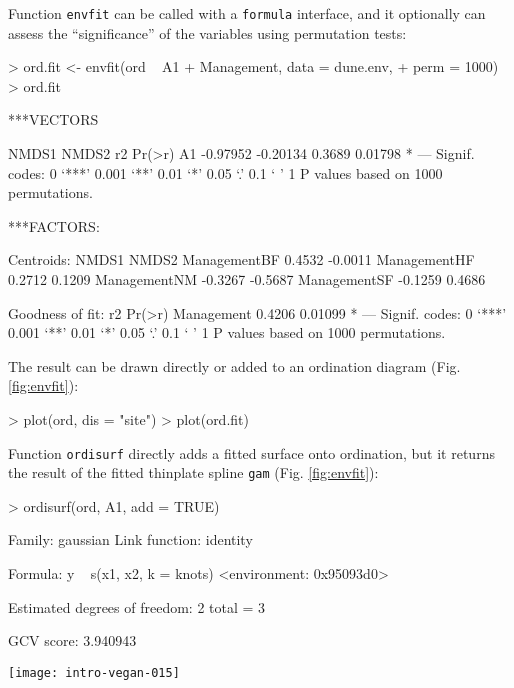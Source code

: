 \documentclass[a4paper,10pt]{amsart}
\begin{document}
Function \texttt{envfit} can be called with a \texttt{formula}
interface, and it optionally can assess the ``significance'' of the
variables using permutation tests:
\begin{Schunk}
\begin{Sinput}
> ord.fit <- envfit(ord ~ A1 + Management, data = dune.env, 
+     perm = 1000)
> ord.fit
\end{Sinput}
\begin{Soutput}
***VECTORS

      NMDS1    NMDS2     r2  Pr(>r)  
A1 -0.97952 -0.20134 0.3689 0.01798 *
---
Signif. codes:  0 ‘***’ 0.001 ‘**’ 0.01 ‘*’ 0.05 ‘.’ 0.1 ‘ ’ 1 
P values based on 1000 permutations.

***FACTORS:

Centroids:
               NMDS1   NMDS2
ManagementBF  0.4532 -0.0011
ManagementHF  0.2712  0.1209
ManagementNM -0.3267 -0.5687
ManagementSF -0.1259  0.4686

Goodness of fit:
               r2  Pr(>r)  
Management 0.4206 0.01099 *
---
Signif. codes:  0 ‘***’ 0.001 ‘**’ 0.01 ‘*’ 0.05 ‘.’ 0.1 ‘ ’ 1 
P values based on 1000 permutations.
\end{Soutput}
\end{Schunk}
The result can be drawn directly or added to an ordination diagram
(Fig. \ref{fig:envfit}):
\begin{Schunk}
\begin{Sinput}
> plot(ord, dis = "site")
> plot(ord.fit)
\end{Sinput}
\end{Schunk}

Function \texttt{ordisurf} directly adds a fitted surface onto
ordination, but it returns the result of the fitted thinplate spline
\texttt{gam} (Fig. \ref{fig:envfit}):
\begin{Schunk}
\begin{Sinput}
> ordisurf(ord, A1, add = TRUE)
\end{Sinput}
\begin{Soutput}
Family: gaussian 
Link function: identity 

Formula:
y ~ s(x1, x2, k = knots)
<environment: 0x95093d0>

Estimated degrees of freedom:
2  total = 3 

GCV score: 3.940943
\end{Soutput}
\end{Schunk}
\begin{SCfigure}
\texttt{[image: intro-vegan-015]}
\caption{Fitted vector and smooth surface for the thickness of A1
  horizon (\texttt{A1}, in cm), and centroids of Management levels.}
\label{fig:envfit}
\end{SCfigure}
\end{document}

